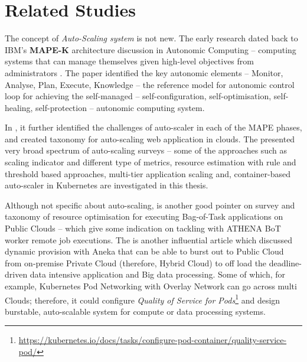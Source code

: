 \chapter{Related Studies} 

\label{Chapter5} 

The concept of \textit{Auto-Scaling system} is not new. The early research dated back to IBM's \textbf{MAPE-K} architecture discussion in Autonomic Computing -- computing systems that can manage themselves given high-level objectives from administrators \parencite{1160055}. The paper \parencite{1160055} identified the key autonomic elements  -- Monitor, Analyse, Plan, Execute, Knowledge -- the reference model for autonomic control loop for achieving the self-managed -- self-configuration, self-optimisation, self-healing, self-protection -- autonomic computing system.

In \parencite{Chenhao}, it further identified the challenges of auto-scaler in each of the MAPE phases, and created taxonomy for auto-scaling web application in clouds. The \parencite{Chenhao} presented very broad spectrum of auto-scaling surveys -- some of the approaches such as scaling indicator and different type of metrics, resource estimation with rule and threshold based approaches, multi-tier application scaling and, container-based auto-scaler in Kubernetes are investigated in this thesis. 

Although not specific about auto-scaling, \parencite{Thai} is another good pointer on survey and taxonomy of resource optimisation for executing Bag-of-Task applications on Public Clouds -- which give some indication on tackling with ATHENA BoT worker remote job executions. The \parencite{ToosiSB18} is another influential article which discussed dynamic provision with Aneka that can be able to burst out to Public Cloud from on-premise Private Cloud (therefore, Hybrid Cloud) to off load the deadline-driven data intensive application and Big data processing. Some of which, for example, Kubernetes Pod Networking with Overlay Network can go across multi Clouds; therefore, it could configure \emph{Quality of Service for Pods}\footnote{\url{https://kubernetes.io/docs/tasks/configure-pod-container/quality-service-pod/}} and design burstable, auto-scalable system for compute or data processing systems.

